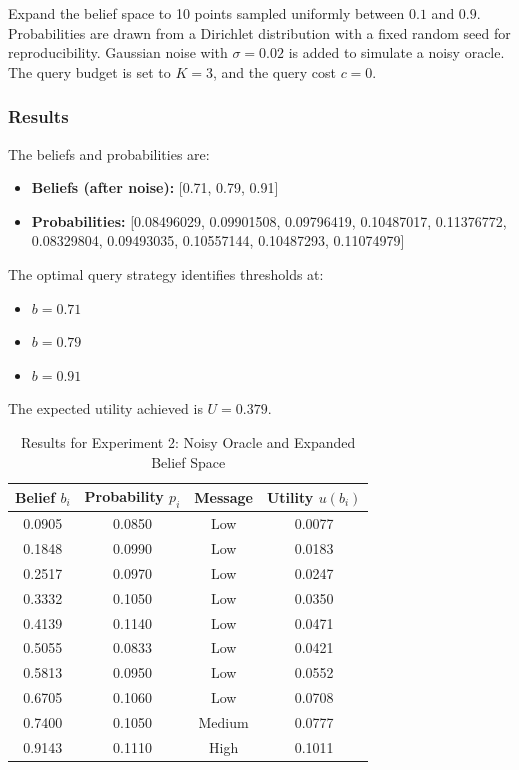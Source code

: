 \documentclass[12pt]{article}
\begin{document}
Expand the belief space to 10 points sampled uniformly between \( 0.1 \) and \( 0.9 \). Probabilities are drawn from a Dirichlet distribution with a fixed random seed for reproducibility. Gaussian noise with \( \sigma = 0.02 \) is added to simulate a noisy oracle. The query budget is set to \( K = 3 \), and the query cost \( c = 0 \).

\subsubsection{Results}

The beliefs and probabilities are:

\begin{itemize}
    \item \textbf{Beliefs (after noise):} [0.71, 0.79, 0.91]
    \item \textbf{Probabilities:} [0.08496029, 0.09901508, 0.09796419, 0.10487017, 0.11376772, 0.08329804, 0.09493035, 0.10557144, 0.10487293, 0.11074979]
\end{itemize}

The optimal query strategy identifies thresholds at:

\begin{itemize}
    \item \( b = 0.71 \)
    \item \( b = 0.79 \)
    \item \( b = 0.91 \)
\end{itemize}

The expected utility achieved is \( U = 0.379 \).

\begin{table}[H]
\centering
\small
\begin{tabular}{|c|c|c|c|}
\hline
\textbf{Belief \( b_i \)} & \textbf{Probability \( p_i \)} & \textbf{Message} & \textbf{Utility \( u(b_i) \)} \\
\hline
0.0905 & 0.0850 & Low & 0.0077 \\
0.1848 & 0.0990 & Low & 0.0183 \\
0.2517 & 0.0970 & Low & 0.0247 \\
0.3332 & 0.1050 & Low & 0.0350 \\
0.4139 & 0.1140 & Low & 0.0471 \\
0.5055 & 0.0833 & Low & 0.0421 \\
0.5813 & 0.0950 & Low & 0.0552 \\
0.6705 & 0.1060 & Low & 0.0708 \\
0.7400 & 0.1050 & Medium & 0.0777 \\
0.9143 & 0.1110 & High & 0.1011 \\
\hline
\end{tabular}
\caption{Results for Experiment 2: Noisy Oracle and Expanded Belief Space}
\label{table:experiment2}
\end{table}
\end{document}
